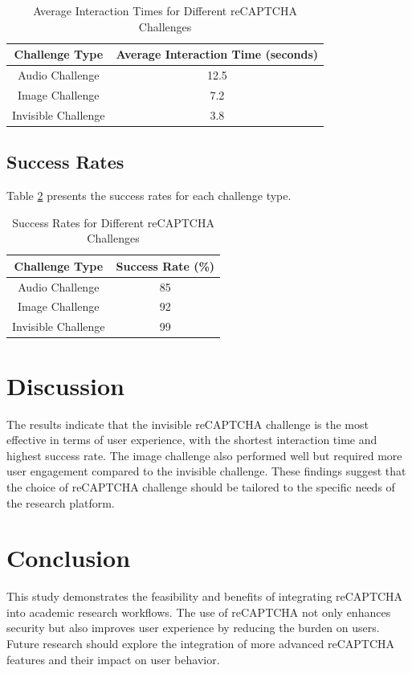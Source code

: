 \documentclass{article}
\begin{document}
\begin{table}[ht]
\centering
\begin{tabular}{|c|c|}
\hline
\textbf{Challenge Type} & \textbf{Average Interaction Time (seconds)} \\ \hline
Audio Challenge & 12.5 \\ \hline
Image Challenge & 7.2 \\ \hline
Invisible Challenge & 3.8 \\ \hline
\end{tabular}
\caption{Average Interaction Times for Different reCAPTCHA Challenges}
\label{tab:interaction_times}
\end{table}

\subsection{Success Rates}
Table \ref{tab:succ_rates} presents the success rates for each challenge type.

\begin{table}[ht]
\centering
\begin{tabular}{|c|c|}
\hline
\textbf{Challenge Type} & \textbf{Success Rate (\%)} \\ \hline
Audio Challenge & 85 \\ \hline
Image Challenge & 92 \\ \hline
Invisible Challenge & 99 \\ \hline
\end{tabular}
\caption{Success Rates for Different reCAPTCHA Challenges}
\label{tab:succ_rates}
\end{table}

\section{Discussion}
The results indicate that the invisible reCAPTCHA challenge is the most effective in terms of user experience, with the shortest interaction time and highest success rate. The image challenge also performed well but required more user engagement compared to the invisible challenge. These findings suggest that the choice of reCAPTCHA challenge should be tailored to the specific needs of the research platform.

\section{Conclusion}
This study demonstrates the feasibility and benefits of integrating reCAPTCHA into academic research workflows. The use of reCAPTCHA not only enhances security but also improves user experience by reducing the burden on users. Future research should explore the integration of more advanced reCAPTCHA features and their impact on user behavior.
\end{document}
